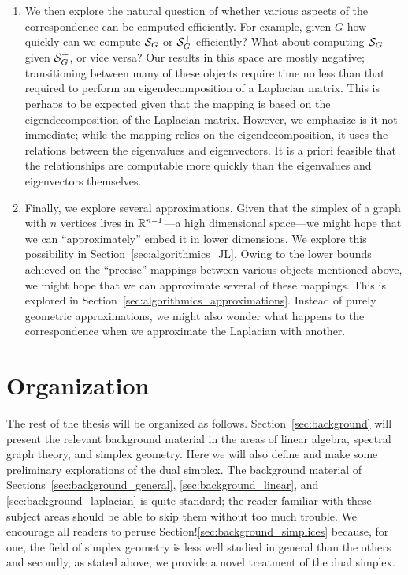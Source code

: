 \begin{itemize}
\begin{enumerate}
		\item We then explore the natural question of whether various aspects of the correspondence can be computed efficiently. For example, given $G$ how quickly can we compute $\mathcal{S}_G$ or $\mathcal{S}_G^+$ efficiently? What about computing $\mathcal{S}_G$ given $\mathcal{S}_G^+$, or vice  versa? Our results in this  space are mostly negative; transitioning between many of these objects require time no less than that required to perform an eigendecomposition of a Laplacian matrix. 
		This is perhaps to be expected given that the mapping is based on the eigendecomposition of the Laplacian matrix. 
		However, we emphasize is it not immediate; while the mapping relies on the eigendecomposition, it uses the relations between the eigenvalues and eigenvectors. It is a priori  feasible that the relationships are computable  more quickly than the eigenvalues and eigenvectors  themselves. 
		\item Finally, we explore several approximations. Given that  the simplex of a graph with $n$ vertices lives in $\mathbb{R}^{n-1}$---a high dimensional  space---we might hope that we can ``approximately'' embed it  in  lower dimensions. We explore this possibility in Section~\ref{sec:algorithmics_JL}. Owing to the lower bounds achieved on the ``precise'' mappings between various objects mentioned above, we might hope that we can approximate several of these mappings. This is explored in Section~\ref{sec:algorithmics_approximations}. 
		Instead of purely geometric approximations, we might also wonder what happens to the correspondence when we approximate the Laplacian with another. 
	\end{enumerate}

\end{itemize}

\section{Organization}
\label{sec:intro_organization}

The rest of the thesis will be  organized as follows. Section~\ref{sec:background} will present the relevant background material in the areas of linear algebra, spectral graph theory, and simplex  geometry. Here we will also define and make some preliminary explorations of the dual simplex. The  background material  of Sections~\ref{sec:background_general}, \ref{sec:background_linear},  and \ref{sec:background_laplacian} is quite standard; the reader familiar with  these subject areas should  be able to skip  them without too much trouble. We  encourage all readers to peruse Section!\ref{sec:background_simplices} because, for one, the field  of simplex geometry is  less  well  studied  in general than the others and secondly, as stated above, we provide a novel treatment of  the dual simplex. 



